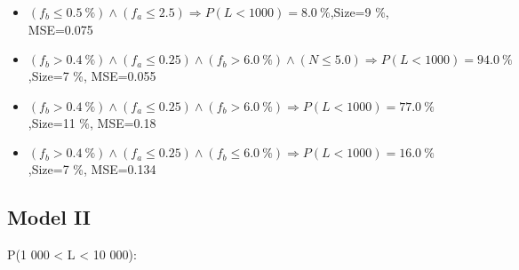 \documentclass[numbered]{CSL}
\begin{document}
\begin{itemize}
\item $(f_b \leq 0.5~\%) \land (f_a \leq 2.5) \Rightarrow P(L < 1 000) = 8.0~\%$,\hfill Size=9 \%, MSE=0.075
\item $(f_b > 0.4~\%) \land (f_a \leq 0.25) \land (f_b > 6.0~\%) \land (N \leq 5.0) \Rightarrow P(L < 1 000) = 94.0~\%$,\hfill Size=7 \%, MSE=0.055
\item $(f_b > 0.4~\%) \land (f_a \leq 0.25) \land (f_b > 6.0~\%) \Rightarrow P(L < 1 000) = 77.0~\%$,\hfill Size=11 \%, MSE=0.18
\item $(f_b > 0.4~\%) \land (f_a \leq 0.25) \land (f_b \leq 6.0~\%) \Rightarrow P(L < 1 000) = 16.0~\%$,\hfill Size=7 \%, MSE=0.134
\end{itemize}

\subsection{Model II}
P(1 000 < L < 10 000):
\end{document}
